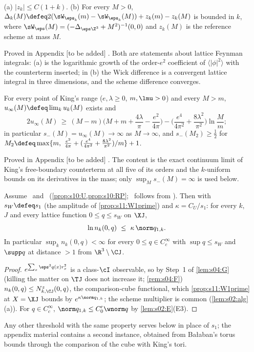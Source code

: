 \begin{lemma}[$c$-numbers]\label{lem:k02:cnum}
\textup{(a)} $|z_k|\le C(1+k)$. \textup{(b)} For every $M>0$, $\Delta_k(M)\defeq2(\sW_{\eps_k}(m)-\sW_{\eps_k}(M))+z_k(m)-z_k(M)$ is bounded in $k$, where $\sW_\eps(M)=(-\Delta_{\eps\Z^3}+M^2)^{-1}(0,0)$ and $z_k(M)$ is the reference scheme at mass $M$.
\end{lemma}
Proved in Appendix [to be added] . Both are statements about lattice Feynman integrals: (a) is the logarithmic growth of the order-$e^2$ coefficient of $\langle|\phi|^2\rangle$ with the counterterm inserted; in (b) the Wick difference is a convergent lattice integral in three dimensions, and the scheme difference converges.

\begin{proposition}\label{prop:k02:NEG}
For every point of King's range ($e,\lambda\ge0$, $m,\lmu>0$) and every $M>m$, $u_\infty(M)\defeq\lim_ku_k(M)$ exists and
\[
2u_\infty(M)\ \ge\ (M-m)\Big(M+m+\frac{4\lambda}{\pi}-\frac{e^2}{4\pi}\Big)-\Big(\frac{e^4}{4\pi^2}+\frac{8\lambda^2}{\pi^2}\Big)\ln\frac Mm ;
\]
in particular $s_-(M)=u_\infty(M)\to\infty$ as $M\to\infty$, and $s_-(M_2)\ge\frac12$ for $M_2\defeq\max\{m,\ \frac{e^2}{4\pi}+(\frac{e^4}{4\pi^2}+\frac{8\lambda^2}{\pi^2})/m\}+1$.
\end{proposition}
Proved in Appendix [to be added] . The content is the exact continuum limit of King's free-boundary counterterm at all five of its orders and the $k$-uniform bounds on its derivatives in the mass; only $\sup_Ms_-(M)=\infty$ is used below.

\begin{proposition}\label{prop:k02:Wsharp}
Assume \Itwo\ and \Ithree\ (\cref{prop:s10:U,prop:s10:RP}; \Itwo\ follows from \Tall). Then with $s_W\defeq s_1$ (the amplitude of \cref{prop:s11:W1prime}) and $\kappa=C_U/s_1$: for every $k$, $J$ and every lattice function $0\le q\le s_W$ on $\XJ$,
\[
\ln n_k(0,q)\ \le\ \kappa\,\norm q_{1,k}.
\]
In particular $\sup_kn_k(0,q)<\infty$ for every $0\le q\in C^\infty_c$ with $\sup q\le s_W$ and $\supp q$ at distance $>1$ from $\R^3\setminus\CJ$.
\end{proposition}
\begin{proof}
$e^{\sum_x\eps^3q(x)r_x^2}$ is a class-$\cI$ observable, so by Step~1 of \cref{lem:s04:G} (killing the matter on $\TJ$ does not increase it; \cref{rem:s04:F}) $n_k(0,q)\le N^z_{k,\CJ}(0,q)$, the comparison-cube functional, which \cref{prop:s11:W1prime} at $X=\XJ$ bounds by $e^{\kappa\norm q_{1,k}}$; the scheme multiplier is common (\cref{lem:s02:alg}(a)). For $q\in C^\infty_c$, $\norm q_{1,k}\le C_0'\wnorm q$ by \cref{lem:s02:E}(E3).
\end{proof}
Any other threshold with the same property serves below in place of $s_1$; the appendix material contains a second instance, obtained from Ba{\l}aban's torus bounds through the comparison of the cube with King's tori.

